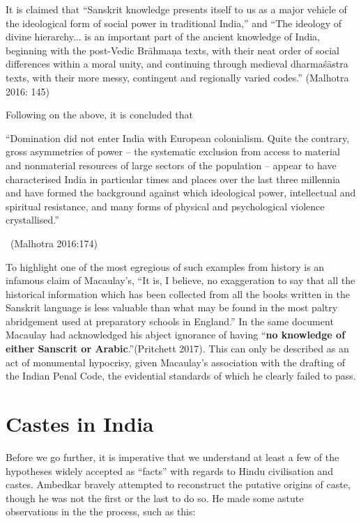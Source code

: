 It is claimed that “Sanskrit knowledge presents itself to us as a major vehicle of the ideological form of social power in traditional India,” and “The ideology of divine hierarchy... is an important part of the ancient knowledge of India, beginning with the post-Vedic Brāhmaṇa texts, with their neat order of social differences within a moral unity, and continuing through medieval dharmaśāstra texts, with their more messy, contingent and regionally varied codes.” (Malhotra 2016: 145)

Following on the above, it is concluded that

\begin{myquote}
“Domination did not enter India with European colonialism. Quite the contrary, gross asymmetries of power – the systematic exclusion from access to material and nonmaterial resources of large sectors of the population – appear to have characterised India in particular times and places over the last three millennia and have formed the background against which ideological power, intellectual and spiritual resistance, and many forms of physical and psychological violence crystallised.” 

~\hfill (Malhotra 2016:174)
\end{myquote}

To highlight one of the most egregious of such examples from history is an infamous claim of Macaulay’s, “It is, I believe, no exaggeration to say that all the historical information which has been collected from all the books written in the Sanskrit language is less valuable than what may be found in the most paltry abridgement used at preparatory schools in England.” In the same document Macaulay had acknowledged his abject ignorance of having “\textbf{no knowledge of either Sanscrit or Arabic}.”(Pritchett 2017). This can only be described as an act of monumental hypocrisy, given Macaulay's association with the drafting of the Indian Penal Code, the evidential standards of which he clearly failed to pass.


\section*{Castes in India}

Before we go further, it is imperative that we understand at least a few of the hypotheses widely accepted as “facts” with regards to Hindu civilisation and castes. Ambedkar bravely attempted to reconstruct the putative origins of caste, though he was not the first or the last to do so. He made some astute observations in the the process, such as this:


